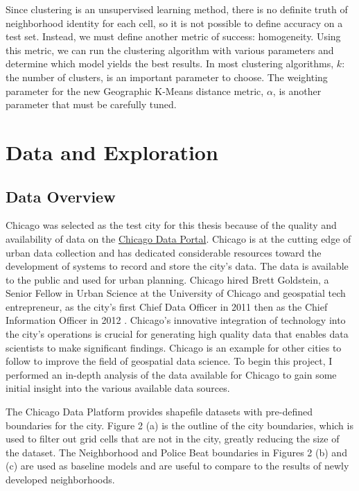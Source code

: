 \documentclass[times new roman,12pt]{article}
\begin{document}
Since clustering is an unsupervised learning method, there is no definite truth of neighborhood identity for each cell, so it is not possible to define accuracy on a test set. Instead, we must define  another metric of success: homogeneity. Using this metric, we can run the clustering algorithm with various parameters and determine which model yields the best results. In most clustering algorithms, $k$: the number of clusters, is an important parameter to choose. The weighting parameter for the new Geographic K-Means distance metric, $\alpha$, is another parameter that must be carefully tuned.

\newpage

\section{Data and Exploration}

\subsection{Data Overview}

Chicago was selected as the test city for this thesis because of the quality and availability of data on the \href{https://data.cityofchicago.org}{Chicago Data Portal}. Chicago is at the cutting edge of urban data collection and has dedicated considerable resources toward the development of systems to record and store the city's data. The data is available to the public and used for urban planning. Chicago hired Brett Goldstein, a Senior Fellow in Urban Science at the University of Chicago and geospatial tech entrepreneur, as the city's first Chief Data Officer in 2011 then as the Chief Information Officer in 2012 \cite{goldstein_open_2013}. Chicago's innovative integration of technology into the city's operations is crucial for generating high quality data that enables data scientists to make significant findings. Chicago is an example for other cities to follow to improve the field of geospatial data science. To begin this project, I performed an in-depth analysis of the data available for Chicago to gain some initial insight into the various available data sources.

The Chicago Data Platform provides shapefile datasets with pre-defined boundaries for the city. Figure 2 (a) is the outline of the city boundaries, which is used to filter out grid cells that are not in the city, greatly reducing the size of the dataset. The Neighborhood and Police Beat boundaries in Figures 2 (b) and (c) are used as baseline models and are useful to compare to the results of newly developed neighborhoods. 
\end{document}
